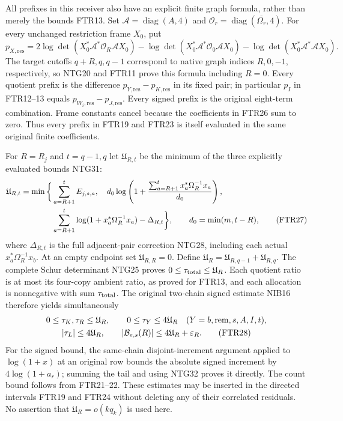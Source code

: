All prefixes in this receiver also have an explicit finite graph
formula, rather than merely the bounds FTR13. Set
$\mathcal A=\operatorname{diag}(A,4)$ and
$\mathcal O_r=\operatorname{diag}(\overline{\Omega_r},4)$.
For every unchanged restriction frame $X_0$, put
\[
 p_{X,\mathrm{res}}=2\log\det(X_0^*\mathcal A^*\mathcal O_R\mathcal A X_0)
       -\log\det(X_0^*\mathcal A^*\mathcal O_0\mathcal A X_0)
       -\log\det(X_0^*\mathcal A^*\mathcal A X_0).        \tag{FTR26}
\]
The target cutoffs $q+R,q,q-1$ correspond to native graph
indices $R,0,-1$, respectively, so NTG20 and FTR11 prove this
formula including $R=0$. Every quotient prefix is the difference
$p_{Y,\mathrm{res}}-p_{K,\mathrm{res}}$ in its fixed pair;
in particular $p_I$ in FTR12--13 equals
$p_{W_i,\mathrm{res}}-p_{J,\mathrm{res}}$.
Every signed prefix is the original
eight-term combination. Frame constants cancel because the
coefficients in FTR26 sum to zero. Thus every prefix in FTR19
and FTR23 is itself evaluated in the same original finite coefficients.

For $R=R_j$ and $t=q-1,q$ let $\mathfrak U_{R,t}$ be the
minimum of the three explicitly evaluated bounds NTG31:
\[
\begin{split}
 \mathfrak U_{R,t}=\min\bigg\{&\sum_{a=R+1}^{t}E_{j,s,a},\quad
 d_0\log\left(1+{\sum_{a=R+1}^{t}x_a^*\Omega_R^{-1}x_a\over d_0}\right),\\
 &\sum_{a=R+1}^{t}\log(1+x_a^*\Omega_R^{-1}x_a)
       -\Delta_{R,t}\bigg\},\qquad d_0=\min(m,t-R),
                                                               \tag{FTR27}
\end{split}
\]
where $\Delta_{R,t}$ is the full adjacent-pair correction NTG28,
including each actual $x_a^*\Omega_R^{-1}x_b$. At an empty endpoint
set $\mathfrak U_{R,R}=0$. Define
$\mathfrak U_R=\mathfrak U_{R,q-1}+\mathfrak U_{R,q}$.
The complete Schur determinant NTG25 proves
$0\le\tau_{\rm total}\le\mathfrak U_R$.
Each quotient ratio is at most its four-copy ambient ratio,
as proved for FTR13, and each allocation is nonnegative with
sum $\tau_{\rm total}$. The original two-chain signed estimate
NIB16 therefore yields simultaneously
\[
\begin{gathered}
 0\le\tau_K,\tau_R\le\mathfrak U_R,\qquad
 0\le\tau_Y\le4\mathfrak U_R\quad
                 (Y=b,{\rm rem},s,A,I,t),\\
 |\tau_L|\le4\mathfrak U_R,\qquad
 |\mathcal B_{e,s}(R)|\le4\mathfrak U_R+\varepsilon_R .  \tag{FTR28}
\end{gathered}
\]
For the signed bound, the same-chain disjoint-increment argument
applied to $\log(1+x)$ at an original row bounds the absolute
signed increment by $4\log(1+a_r)$; summing the tail and using
NTG32 proves it directly. The count bound follows from FTR21--22.
These estimates may be inserted in the directed intervals FTR19
and FTR24 without deleting any of their correlated residuals.
No assertion that $\mathfrak U_R=o(kq_k)$ is used here.

